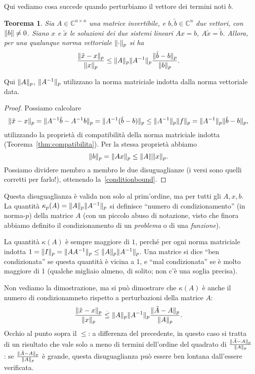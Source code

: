 \documentclass[a4paper]{report}
\DeclarePairedDelimiter{\norm}{\lVert}{\rVert}
\newtheorem{theorem}{Teorema}[chapter]
\theoremstyle{definiton}
\theoremstyle{remark}
\begin{document}
Qui vediamo cosa succede quando perturbiamo il vettore dei termini noti $b$. 

\begin{theorem}
    Sia $A\in \mathbb{C}^{n\times n}$ una matrice invertibile, e $b,\tilde{b} \in \mathbb{C}^n$ due vettori, con $\norm{b}\neq 0$. Siano $x$ e $\tilde{x}$ le soluzioni dei due sistemi lineari $Ax=b$, $A\tilde{x}=\tilde{b}$. Allora, per una qualunque norma vettoriale $\norm{\cdot}_p$ si ha
    \begin{equation} \label{conditionbound}
        \frac{\norm{\tilde{x}-x}_p}{\norm{x}_p} \leq \norm{A}_p\norm{A^{-1}}_p \frac{\norm{\tilde{b}-b}_p}{\norm{b}_p}.    
    \end{equation}
\end{theorem}
Qui $\norm{A}_p$, $\norm{A^{-1}}_p$ utilizzano la norma matriciale indotta dalla norma vettoriale data.
\begin{proof}
Possiamo calcolare
\[
\norm{\tilde{x}-x}_p = \norm{A^{-1}\tilde{b} - A^{-1}b}_p = \norm{A^{-1}(\tilde{b}-b)}_p \leq \norm{A^{-1}}_p\norm{f}_p = \norm{A^{-1}}_p\norm{\tilde{b}-b}_p,
\]
utilizzando la proprietà di compatibilità della norma matriciale indotta (Teorema~\ref{thm:compatibilita}). Per la stessa proprietà abbiamo
\[
\norm{b}_p = \norm{Ax}_p \leq \norm{A}\norm{x}_p.
\]
Possiamo dividere membro a membro le due disuguaglianze (i versi sono quelli corretti per farlo!), ottenendo la~\eqref{conditionbound}.
\end{proof}

Questa disuguaglianza è valida non solo al prim'ordine, ma per tutti gli $A,x,b$. La quantità $\kappa_p(A) = \norm{A}_p\norm{A^{-1}}_p$ si definisce ``numero di condizionamento'' (in norma-$p$) della matrice $A$ (con un piccolo abuso di notazione, visto che finora abbiamo definito il condizionamento di un \emph{problema} o di una \emph{funzione}).


La quantità $\kappa(A)$ è sempre maggiore di $1$, perché per ogni norma matriciale indotta $1 = \norm{I}_p = \norm{AA^{-1}}_p \leq \norm{A}_p\norm{A^{-1}}_p$. Una matrice si dice ``ben condizionata'' se questa quantità è vicina a 1, e ``mal condizionata'' se è molto maggiore di 1 (qualche migliaio almeno, di solito; non c'è una soglia precisa).

Non vediamo la dimostrazione, ma si può dimostrare che $\kappa(A)$ è anche il numero di condizionamneto rispetto a perturbazioni della matrice $A$:
\[
\frac{\norm{\tilde{x}-x}_p}{\norm{x}_p} \mathrel{\stackrel{.}{\leq}} \norm{A}_p\norm{A^{-1}}_p \frac{\norm{\tilde{A}-A}_p}{\norm{A}_p}.
\]
Occhio al punto sopra il $\leq$: a differenza del precedente, in questo caso si tratta di un risultato che vale solo a meno di termini dell'ordine del quadrato di $\frac{\norm{\tilde{A}-A}_p}{\norm{A}_p}$: se $\frac{\norm{\tilde{A}-A}_p}{\norm{A}_p}$ è grande, questa disuguaglianza può essere ben lontana dall'essere verificata.
\end{document}
